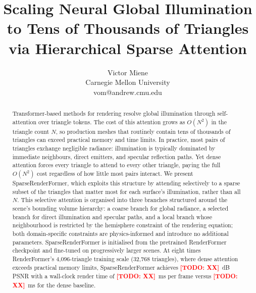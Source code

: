 \documentclass{egpubl}
\newcommand{\ours}{SparseRenderFormer\xspace}
\newcommand{\RF}{RenderFormer\xspace}
\newcommand{\todo}[1]{\textcolor{red}{\textbf{[TODO: #1]}}}
\begin{document}
\title{Scaling Neural Global Illumination to Tens of Thousands of Triangles\\
       via Hierarchical Sparse Attention}

\author[V. Miene]{Victor Miene\\
  Carnegie Mellon University\\
  {\small\ttfamily vom@andrew.cmu.edu}
}

\maketitle

\begin{abstract}
Transformer-based methods for rendering resolve global illumination through
self-attention over triangle tokens.
The cost of this attention grows as $O(N^2)$ in the triangle count $N$,
so production meshes that routinely contain tens of thousands of triangles
can exceed practical memory and time limits.
In practice, most pairs of triangles exchange negligible radiance:
illumination is typically dominated by immediate neighbours, direct emitters,
and specular reflection paths.
Yet dense attention forces every triangle to attend to every other triangle,
paying the full $O(N^2)$ cost regardless of how little most pairs interact.
We present \ours, which exploits this structure by attending selectively
to a sparse subset of the triangles that matter most for each surface's
illumination, rather than all $N$.
This selective attention is organised into three branches structured around
the scene's bounding volume hierarchy: a coarse branch for global radiance,
a selected branch for direct illumination and specular paths, and a local
branch whose neighbourhood is restricted by the hemisphere constraint of the
rendering equation; both domain-specific constraints are physics-informed
and introduce no additional parameters.
\ours is initialised from the pretrained \RF checkpoint and fine-tuned
on progressively larger scenes.
At eight times \RF's 4{,}096-triangle training scale (32{,}768 triangles),
where dense attention exceeds practical memory limits, \ours achieves
\todo{XX}~dB PSNR with a wall-clock render time of \todo{XX}~ms per
frame versus \todo{XX}~ms for the dense baseline.
\end{abstract}

\end{document}
